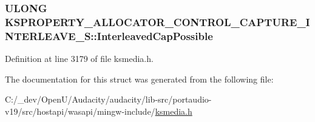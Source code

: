 \subsubsection[{\texorpdfstring{Interleaved\+Cap\+Possible}{InterleavedCapPossible}}]{\setlength{\rightskip}{0pt plus 5cm}U\+L\+O\+NG K\+S\+P\+R\+O\+P\+E\+R\+T\+Y\+\_\+\+A\+L\+L\+O\+C\+A\+T\+O\+R\+\_\+\+C\+O\+N\+T\+R\+O\+L\+\_\+\+C\+A\+P\+T\+U\+R\+E\+\_\+\+I\+N\+T\+E\+R\+L\+E\+A\+V\+E\+\_\+\+S\+::\+Interleaved\+Cap\+Possible}\hypertarget{struct_k_s_p_r_o_p_e_r_t_y___a_l_l_o_c_a_t_o_r___c_o_n_t_r_o_l___c_a_p_t_u_r_e___i_n_t_e_r_l_e_a_v_e___s_a36aa1cee54245c5b3f3062f5caa8f026}{}\label{struct_k_s_p_r_o_p_e_r_t_y___a_l_l_o_c_a_t_o_r___c_o_n_t_r_o_l___c_a_p_t_u_r_e___i_n_t_e_r_l_e_a_v_e___s_a36aa1cee54245c5b3f3062f5caa8f026}


Definition at line 3179 of file ksmedia.\+h.



The documentation for this struct was generated from the following file\+:\begin{DoxyCompactItemize}
\item 
C\+:/\+\_\+dev/\+Open\+U/\+Audacity/audacity/lib-\/src/portaudio-\/v19/src/hostapi/wasapi/mingw-\/include/\hyperlink{ksmedia_8h}{ksmedia.\+h}\end{DoxyCompactItemize}
